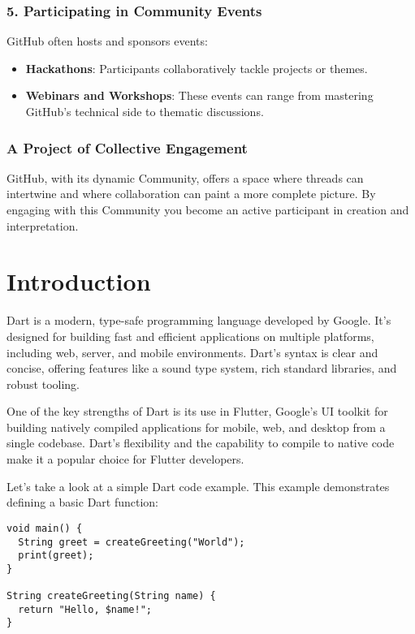 \documentclass{book}
\begin{document}
\subsection*{5. Participating in Community Events}
GitHub often hosts and sponsors events:

\begin{itemize}
    \item \textbf{Hackathons}: Participants collaboratively tackle projects or themes.
    \item \textbf{Webinars and Workshops}: These events can range from mastering GitHub's technical side to thematic discussions.
\end{itemize}

\subsection*{A Project of Collective Engagement}
GitHub, with its dynamic Community, offers a space where threads can intertwine and where collaboration can paint a more complete picture. By engaging with this Community you become an active participant in creation and interpretation.

\chapter{Introduction}

Dart is a modern, type-safe programming language developed by Google. It's designed for building fast and efficient applications on multiple platforms, including web, server, and mobile environments. Dart's syntax is clear and concise, offering features like a sound type system, rich standard libraries, and robust tooling.

One of the key strengths of Dart is its use in Flutter, Google's UI toolkit for building natively compiled applications for mobile, web, and desktop from a single codebase. Dart's flexibility and the capability to compile to native code make it a popular choice for Flutter developers.

Let's take a look at a simple Dart code example. This example demonstrates defining a basic Dart function:

\begin{lstlisting}[style=dartstyle]
void main() {
  String greet = createGreeting("World");
  print(greet);
}

String createGreeting(String name) {
  return "Hello, $name!";
}
\end{lstlisting}
\end{document}
